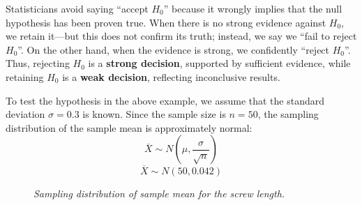 \documentclass[twoside]{book}
\begin{document}
Statisticians avoid saying ``accept $H_0$'' because it wrongly implies that the null hypothesis has been proven true. When there is no strong evidence against $H_0$, we retain it—but this does not confirm its truth; instead, we say we ``fail to reject $H_0$''. On the other hand, when the evidence is strong, we confidently ``reject $H_0$''. Thus, rejecting $H_0$ is a \textbf{strong decision}, supported by sufficient evidence, while retaining $H_0$ is a \textbf{weak decision}, reflecting inconclusive results.

To test the hypothesis in the above example, we assume that the
standard deviation $\sigma = 0.3$ is known. Since the sample size is $n = 50$, the sampling distribution of the sample mean is approximately normal: \[
    \overline{X} \sim N\left( \mu, \frac{\sigma}{\sqrt{n}} \right)
    \]
     \[
    \overline{X} \sim N\left( 50, 0.042 \right)
    \]

\begin{figure}[H]
\begin{center}
\end{center}
\caption{\textit{Sampling distribution of sample mean for the screw length.}}
\label{fig:sampling_dist_screw_mean}
\end{figure}

\end{document}

